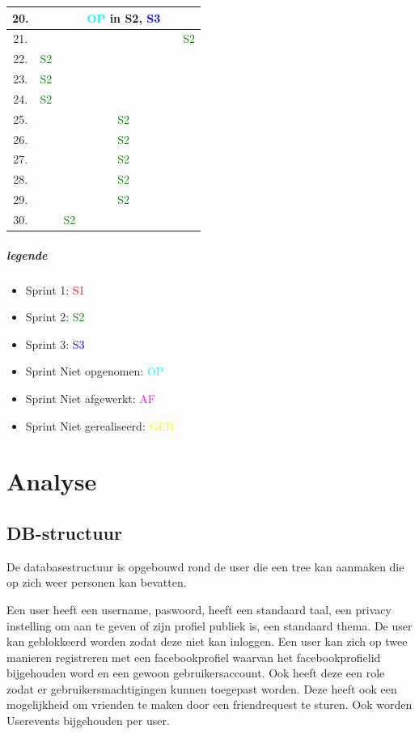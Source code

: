 \documentclass[pdftex,a4paper,12pt,twoside]{report}
\begin{document}
\begin{tabular}{|c|c|c|c|c|c|}
\hline 20.  &  &  & \textcolor{cyan}{OP} in S2, \textcolor{blue}{S3} &  &  \\
\hline 21. &  &  &  &  & \textcolor{green}{S2}   \\ 
\hline 22. & \textcolor{green}{S2}  &  &  &  &  \\
\hline 23.  & \textcolor{green}{S2} &  &  &  &  \\
\hline 24.  & \textcolor{green}{S2} &  &  &  &  \\
\hline 25.  &  &  & \textcolor{green}{S2}  &  &  \\
\hline 26.  &  &  & \textcolor{green}{S2}  &  &  \\
\hline 27.  &  &  & \textcolor{green}{S2}  &  &  \\
\hline 28.  &  &  & \textcolor{green}{S2} &  &  \\
\hline 29.  &  &  & \textcolor{green}{S2} &  &  \\
\hline 30.  &  &\textcolor{green}{S2}  &  &  &  \\
\hline 
\end{tabular} 

\paragraph{legende}
\begin{itemize}
\item Sprint 1: \textcolor{red}{S1}
\item Sprint 2: \textcolor{green}{S2}
\item Sprint 3: \textcolor{blue}{S3}
\item Sprint Niet opgenomen: \textcolor{cyan}{OP}
\item Sprint Niet afgewerkt: \textcolor{magenta}{AF}
\item Sprint Niet gerealiseerd: \textcolor{yellow}{GER}
\end{itemize}

\chapter{Analyse}
\section{DB-structuur}
De databasestructuur is opgebouwd rond de user die een tree kan aanmaken die op zich weer personen kan bevatten. 

Een user heeft een username, paswoord, heeft een standaard taal, een privacy instelling om aan te geven of zijn profiel publiek is, een standaard thema. De user kan geblokkeerd worden zodat deze niet kan inloggen.
Een user kan zich op twee manieren registreren met een facebookprofiel waarvan het facebookprofielid bijgehouden word en een gewoon gebruikersaccount. Ook heeft deze een role zodat er gebruikersmachtigingen kunnen toegepast worden.
Deze heeft ook een mogelijkheid om vrienden te maken door een friendrequest te sturen.
Ook worden Userevents bijgehouden per user.
\end{document}

